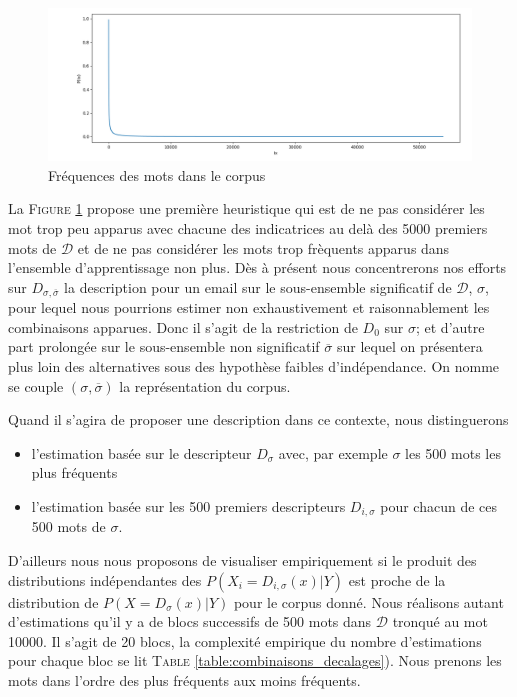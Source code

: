 \documentclass[a4paper, french]{article}
\begin{document}
\begin{figure}[h]
\begin{center}
    \caption{Fr\'equences des mots dans le corpus}
    \includegraphics[width=13cm]{repr0}
\end{center}
\label{fig:repr0}
\end{figure}

La F\textsc{igure} \ref{fig:repr0} propose une premi\`ere heuristique qui est de
ne pas consid\'erer les mot trop peu apparus avec chacune des indicatrices au
del\`a des 5000 premiers mots de $\mathcal{D}$ et de ne pas consid\'erer les
mots trop fr\`equents  apparus dans l'ensemble d'apprentissage non plus. D\`es
\`a pr\'esent nous concentrerons nos efforts sur  $D_{\sigma,\overline\sigma}$
la description pour un email sur le sous-ensemble significatif de $\mathcal{D}$,
$\sigma$, pour lequel nous pourrions estimer non exhaustivement et
raisonnablement les combinaisons apparues. Donc il s'agit de la restriction de
$D_0$ sur $\sigma$; et d'autre part prolong\'ee sur le sous-ensemble non
significatif $\overline\sigma$ sur lequel on pr\'esentera plus loin des
alternatives sous des hypoth\`ese faibles d'ind\'ependance. On nomme se couple
$(\sigma, \overline\sigma)$ la repr\'esentation du corpus.

Quand il s'agira de proposer une description dans ce contexte, nous distinguerons
\begin{itemize}
    \item l'estimation bas\'ee sur le descripteur $D_\sigma$ avec, par exemple
        $\sigma$ les 500 mots les plus fr\'equents
    \item l'estimation bas\'ee sur les 500 premiers descripteurs $D_{i,\sigma}$
        pour chacun de ces 500 mots de $\sigma$.
\end{itemize}


\vskip 4mm
D'ailleurs nous nous proposons de visualiser empiriquement si le produit des
distributions ind\'ependantes des $P(X_i=D_{i,\sigma}(x)|Y)$  est proche de la distribution
de $P(X=D_{\sigma}(x)|Y)$ pour le corpus donn\'e. Nous r\'ealisons autant d'estimations
qu'il y a de blocs successifs de 500 mots dans $\mathcal{D}$ tronqu\'e au mot 10000.
%
Il s'agit de 20 blocs, la complexit\'e empirique du nombre d'estimations
pour chaque bloc se lit T\textsc{able} \ref{table:combinaisons_decalages}).
%
Nous prenons les mots dans l'ordre des plus fr\'equents aux moins fr\'equents.
\end{document}
